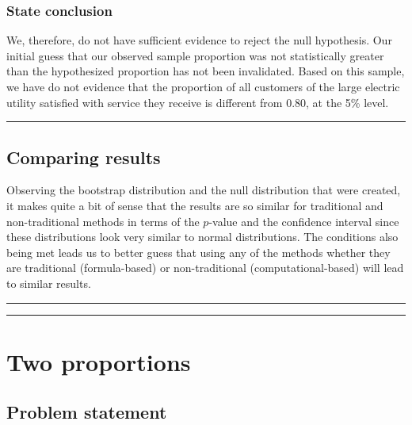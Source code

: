 \documentclass[12pt, krantz2,]{krantz}
\begin{document}
\hypertarget{state-conclusion-1}{%
\subsubsection*{State conclusion}\label{state-conclusion-1}}


We, therefore, do not have sufficient evidence to reject the null hypothesis. Our initial guess that our observed sample proportion was not statistically greater than the hypothesized proportion has not been invalidated. Based on this sample, we have do not evidence that the proportion of all customers of the large electric utility satisfied with service they receive is different from 0.80, at the 5\% level.

\begin{center}\rule{0.5\linewidth}{\linethickness}\end{center}

\hypertarget{comparing-results-1}{%
\subsection{Comparing results}\label{comparing-results-1}}

Observing the bootstrap distribution and the null distribution that were created, it makes quite a bit of sense that the results are so similar for traditional and non-traditional methods in terms of the \(p\)-value and the confidence interval since these distributions look very similar to normal distributions. The conditions also being met leads us to better guess that using any of the methods whether they are traditional (formula-based) or non-traditional (computational-based) will lead to similar results.

\begin{center}\rule{0.5\linewidth}{\linethickness}\end{center}

\begin{center}\rule{0.5\linewidth}{\linethickness}\end{center}

\hypertarget{two-proportions}{%
\section{Two proportions}\label{two-proportions}}

\hypertarget{problem-statement-2}{%
\subsection{Problem statement}\label{problem-statement-2}}
\end{document}

